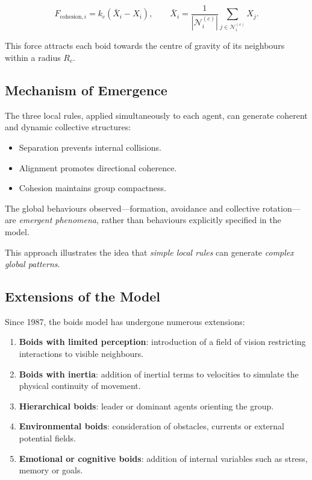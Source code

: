 \documentclass[10pt,a4paper]{article}
\begin{document}
\[
F_{\mathrm{cohesion},i}
=
k_c(\bar X_i-X_i),
\qquad
\bar X_i
=
\frac{1}{|\mathcal N_i^{(c)}|}
\sum_{j\in\mathcal N_i^{(c)}}X_j.
\]

This force attracts each boid towards the
centre of gravity of its neighbours within
a radius $R_c$.

\subsection{Mechanism of Emergence}

The three local rules, applied simultaneously
to each agent, can generate coherent and
dynamic collective structures:

\begin{itemize}
    \item Separation prevents internal collisions.
    \item Alignment promotes directional coherence.
    \item Cohesion maintains group compactness.
\end{itemize}

The global behaviours observed---formation,
avoidance and collective rotation---are
\emph{emergent phenomena}, rather than
behaviours explicitly specified in the model.

This approach illustrates the idea that
\emph{simple local rules} can generate
\emph{complex global patterns}.

\subsection{Extensions of the Model}

Since 1987, the boids model has undergone
numerous extensions:

\begin{enumerate}
    \item \textbf{Boids with limited perception}:
    introduction of a field of vision restricting
    interactions to visible neighbours.

    \item \textbf{Boids with inertia}:
    addition of inertial terms to velocities
    to simulate the physical continuity of movement.

    \item \textbf{Hierarchical boids}:
    leader or dominant agents orienting the group.

    \item \textbf{Environmental boids}:
    consideration of obstacles, currents or
    external potential fields.

    \item \textbf{Emotional or cognitive boids}:
    addition of internal variables such as
    stress, memory or goals.
\end{enumerate}
\end{document}
